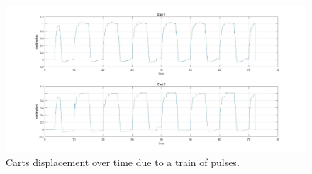 \begin{figure}[h]
	\centering
	\includegraphics[width=0.9\linewidth]{img/hinf_response}
	\caption{Carts displacement over time due to a train of pulses.}
	\label{fig:2dofcarts}
\end{figure}


